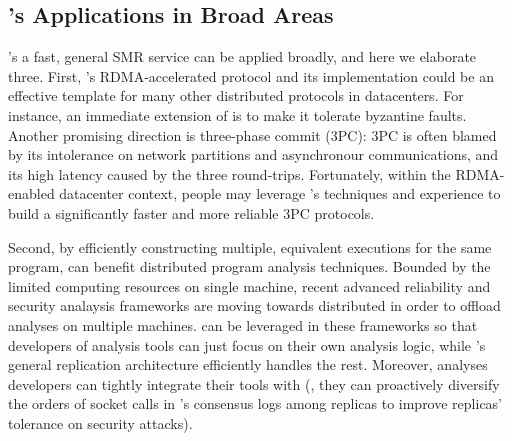 



\subsection{\xxx's Applications in Broad Areas}\label{sec:apps}

\xxx's a fast, general SMR service can be applied broadly, and 
here we elaborate three. First, \xxx's RDMA-accelerated \paxos protocol and its 
implementation could be an effective template for many other distributed 
protocols in datacenters. For instance, an immediate extension of \xxx is to 
make it tolerate byzantine faults. Another promising direction is three-phase 
commit (3PC): 3PC is often blamed by its intolerance on network partitions and 
asynchronour communications, and its high latency caused by the three 
round-trips. Fortunately, within the RDMA-enabled datacenter context, people may 
leverage \xxx's techniques and experience to build a significantly faster and 
more reliable 3PC protocols.


Second, by efficiently constructing multiple, equivalent executions for the 
same program, \xxx can benefit distributed program analysis techniques. Bounded 
by the limited computing resources on single machine, recent advanced 
reliability and security analaysis frameworks are moving towards distributed in 
order to offload analyses on multiple machines. \xxx can be leveraged in these 
frameworks so that developers of analysis tools can just focus on their own 
analysis logic, while \xxx's general replication architecture efficiently 
handles the rest. Moreover, analyses developers can tightly integrate their 
tools with \xxx (\eg, they can proactively diversify the orders of socket 
calls in \xxx's consensus logs among replicas to improve replicas' tolerance on
security attacks).


